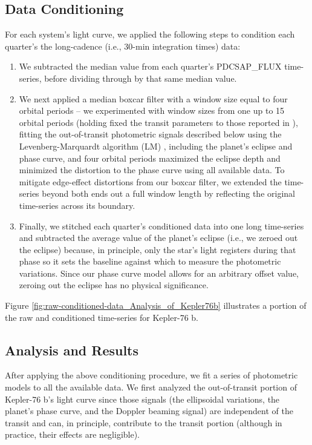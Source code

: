 \documentclass[manuscript]{aastex62}
\begin{document}
\subsection{Data Conditioning}
For each system's light curve, we applied the following steps to condition each quarter's the long-cadence (i.e., 30-min integration times) data:
\begin{enumerate}
\item We subtracted the median value from each quarter's PDCSAP\_FLUX time-series, before dividing through by that same median value.
\item We next applied a median boxcar filter with a window size equal to four orbital periods -- we experimented with window sizes from one up to 15 orbital periods (holding fixed the transit parameters to those reported in \citealt{2013ApJ...771...26F}), fitting the out-of-transit photometric signals described below using the Levenberg-Marquardt algorithm (LM) \citep{newville_2014_11813}, including the planet's eclipse and phase curve, and four orbital periods maximized the eclipse depth and minimized the distortion to the phase curve using all available data. To mitigate edge-effect distortions from our boxcar filter, we extended the time-series beyond both ends out a full window length by reflecting the original time-series across its boundary.
\item Finally, we stitched each quarter's conditioned data into one long time-series and subtracted the average value of the planet's eclipse (i.e., we zeroed out the eclipse) because, in principle, only the star's light registers during that phase so it sets the baseline against which to measure the photometric variations. Since our phase curve model allows for an arbitrary offset value, zeroing out the eclipse has no physical significance.
\end{enumerate}
Figure \ref{fig:raw-conditioned-data_Analysis_of_Kepler76b} illustrates a portion of the raw and conditioned time-series for Kepler-76 b. 

\subsection{Analysis and Results}
After applying the above conditioning procedure, we fit a series of photometric models to all the available data. We first analyzed the out-of-transit portion of Kepler-76 b's light curve since those signals (the ellipsoidal variations, the planet's phase curve, and the Doppler beaming signal) are independent of the transit and can, in principle, contribute to the transit portion (although in practice, their effects are negligible). 
\end{document}
